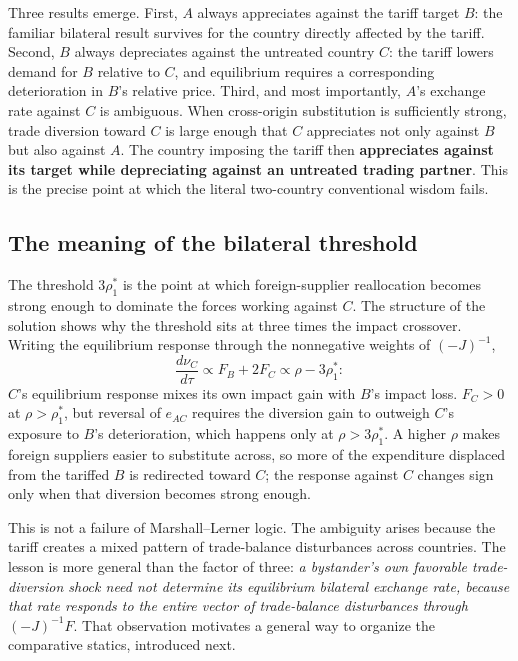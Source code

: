 \documentclass[11pt]{article}
\begin{document}
Three results emerge. First, $A$ always appreciates against the tariff target $B$: the familiar bilateral result survives for the country directly affected by the tariff. Second, $B$ always depreciates against the untreated country $C$: the tariff lowers demand for $B$ relative to $C$, and equilibrium requires a corresponding deterioration in $B$'s relative price. Third, and most importantly, $A$'s exchange rate against $C$ is ambiguous. When cross-origin substitution is sufficiently strong, trade diversion toward $C$ is large enough that $C$ appreciates not only against $B$ but also against $A$. The country imposing the tariff then \textbf{appreciates against its target while depreciating against an untreated trading partner}. This is the precise point at which the literal two-country conventional wisdom fails.

\subsection{The meaning of the bilateral threshold}

The threshold $3\rho_1^*$ is the point at which foreign-supplier reallocation becomes strong enough to dominate the forces working against $C$. The structure of the solution shows why the threshold sits at three times the impact crossover. Writing the equilibrium response through the nonnegative weights of $(-J)^{-1}$,
\begin{equation}
\frac{d\nu_C}{d\tau} \propto F_B + 2F_C \propto \rho - 3\rho_1^* :
\label{eq:3c-signrule}
\end{equation}
$C$'s equilibrium response mixes its own impact gain with $B$'s impact loss. $F_C > 0$ at $\rho > \rho_1^*$, but reversal of $e_{AC}$ requires the diversion gain to outweigh $C$'s exposure to $B$'s deterioration, which happens only at $\rho > 3\rho_1^*$. A higher $\rho$ makes foreign suppliers easier to substitute across, so more of the expenditure displaced from the tariffed $B$ is redirected toward $C$; the response against $C$ changes sign only when that diversion becomes strong enough.

This is not a failure of Marshall--Lerner logic. The ambiguity arises because the tariff creates a mixed pattern of trade-balance disturbances across countries. The lesson is more general than the factor of three: \emph{a bystander's own favorable trade-diversion shock need not determine its equilibrium bilateral exchange rate, because that rate responds to the entire vector of trade-balance disturbances through $(-J)^{-1}F$}. That observation motivates a general way to organize the comparative statics, introduced next.
\end{document}

